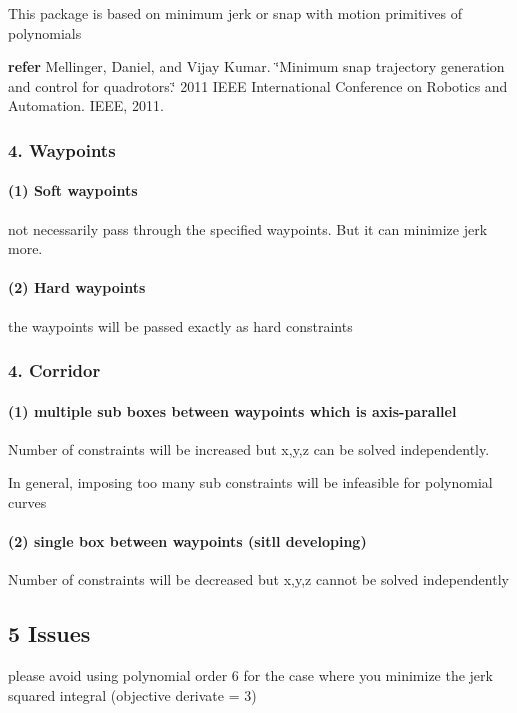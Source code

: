 This package is based on minimum jerk or snap with motion primitives of polynomials

{\bfseries refer} Mellinger, Daniel, and Vijay Kumar. \char`\"{}\+Minimum snap trajectory generation and control for quadrotors.\char`\"{} 2011 I\+E\+EE International Conference on Robotics and Automation. I\+E\+EE, 2011.



 \subsubsection*{4. Waypoints}



\paragraph*{(1) Soft waypoints}

not necessarily pass through the specified waypoints. But it can minimize jerk more.

\paragraph*{(2) Hard waypoints}

the waypoints will be passed exactly as hard constraints





\subsubsection*{4. Corridor}



\paragraph*{(1) multiple sub boxes between waypoints which is axis-\/parallel}

Number of constraints will be increased but x,y,z can be solved independently.

In general, imposing too many sub constraints will be infeasible for polynomial curves

\paragraph*{(2) single box between waypoints (sitll developing)}

Number of constraints will be decreased but x,y,z cannot be solved independently

\subsection*{5 Issues}


\begin{DoxyItemize}
\item please avoid using polynomial order 6 for the case where you minimize the jerk squared integral (objective derivate = 3) 
\end{DoxyItemize}